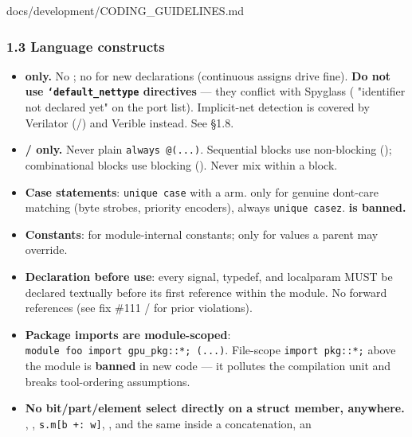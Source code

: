 \begin{relocated}{docs/development/CODING_GUIDELINES.md}
{}

\subsubsection{1.3 Language constructs}\label{um:guide:coding-guidelines:13-language-constructs}

\begin{itemize}
\tightlist
\item
  \textbf{ only.} No ; no  for new
  declarations (continuous assigns drive  fine). \textbf{Do
  not use \texttt{`default\_\allowbreak{}nettype} directives} --- they
  conflict with Spyglass ( "identifier not declared yet" on
  the port list). Implicit-net detection is covered by Verilator
  (/) and Verible instead. See §1.8.
\item
  \textbf{ /  only.} Never plain
  \texttt{always\ @(.\allowbreak{}.\allowbreak{}.\allowbreak{})}.
  Sequential blocks use non-blocking (\code{<=}); combinational blocks
  use blocking (\code{=}). Never mix within a block.
\item
  \textbf{Case statements}: \texttt{unique\ case} with a 
  arm.  only for genuine don\textquotesingle t-care matching
  (byte strobes, priority encoders), always \texttt{unique\ casez}.
  \textbf{ is banned.}
\item
  \textbf{Constants}:  for module-internal constants;
   only for values a parent may override.
\item
  \textbf{Declaration before use}: every signal, typedef, and localparam
  MUST be declared textually before its first reference within the
  module. No forward references (see fix \#111 /  for prior
  violations).
\item
  \textbf{Package imports are module-scoped}:
  \texttt{module\ foo\ import\ gpu\_\allowbreak{}pkg:\allowbreak{}:\allowbreak{}*;\ (.\allowbreak{}.\allowbreak{}.\allowbreak{})}.
  File-scope \texttt{import\ pkg:\allowbreak{}:\allowbreak{}*;} above
  the module is \textbf{banned} in new code --- it pollutes the
  compilation unit and breaks tool-ordering assumptions.
\item
  \textbf{No bit/\allowbreak{}part/\allowbreak{}element select directly
  on a struct member, anywhere.} , ,
  \texttt{s.\allowbreak{}m[b\ +\allowbreak{}:\allowbreak{}\ w]},
  , and the same inside a concatenation, an

\end{itemize}
\end{relocated}
